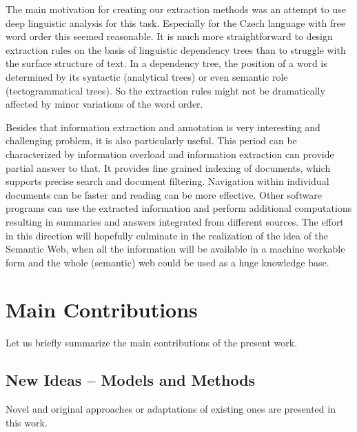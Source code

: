
The main motivation for creating our extraction methods was an attempt to use deep linguistic analysis for this task. Especially for the Czech language with free word order this seemed reasonable. It is much more straightforward to design extraction rules on the basis of linguistic dependency trees than to struggle with the surface structure of text. In a dependency tree, the position of a word is determined by its syntactic (analytical trees) or even semantic role (tectogrammatical trees). So the extraction rules might not be dramatically affected by minor variations of the word order.

Besides that information extraction and annotation is very interesting and challenging problem, it is also particularly useful. This period can be characterized by information overload and information extraction can provide partial answer to that. It provides fine grained indexing of documents, which supports precise search and document filtering. Navigation within individual documents can be faster and reading can be more effective. Other software programs can use the extracted information and perform additional computations resulting in summaries and answers integrated from different sources.  The effort in this direction will hopefully culminate in the realization of the idea of the Semantic Web, when all the information will be available in a machine workable form and the whole (semantic) web could be used as a huge knowledge base.



\section{Main Contributions}

Let us briefly summarize the main contributions of the present work.

\subsection{New Ideas -- Models and Methods}

Novel and original approaches or adaptations of existing ones are presented in this work.

